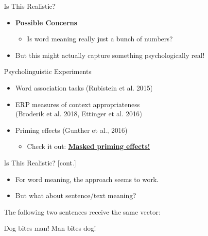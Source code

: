 \documentclass[professionalfonts, xcolor={usenames,svgnames,x11names,table}]{beamer}
\begin{document}
\begin{frame}{Is This Realistic?}
    \begin{itemize}
        \item \textbf{Possible Concerns}
            \begin{itemize}
                \item Is word meaning really just a bunch of numbers?
            \end{itemize}
        \item But this might actually capture something psychologically real!
    \end{itemize}
    \begin{block}{Psycholinguistic Experiments}
        \begin{itemize}
            \item Word association tasks (Rubistein et al. 2015)
             \item ERP measures of context appropriateness \\ (Broderik et al. 2018, Ettinger et al. 2016)
              \item  Priming effects (Gunther et al., 2016)
                 \begin{itemize}
               \item Check it out: \href{http://www.u.arizona.edu/~kforster/priming/index.htm}{\textbf{Masked priming effects!}}
       		 \end{itemize}
         \end{itemize}
    \end{block}
\end{frame}

\begin{frame}{Is This Realistic? [cont.]}
    \begin{itemize}
        \item For word meaning, the approach seems to work.
        \item But what about sentence/text meaning?
    \end{itemize}
    \begin{example}
        The following two sentences receive the same vector:
        \begin{exe}
            \ex
            \begin{xlist}
                \ex Dog bites man!
                \ex Man bites dog!
            \end{xlist}
        \end{exe}
    \end{example}
\end{frame}
\end{document}
